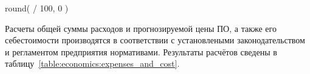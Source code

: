 
 { round( \totalExpense * \supportAndAdaptationRate / 100, 0 )}








Расчеты общей суммы расходов и прогнозируемой цены ПО, а также его себестоимости производятся в соответствии с установлеными законодательством и регламентом предприятия нормативами. Результаты расчётов сведены в таблицу~\ref{table:economics:expenses_and_cost}.


